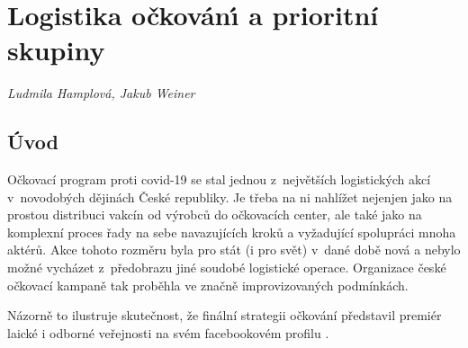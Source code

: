 
\chapter{Logistika o\v{c}kov\'{a}n\'{\i} a prioritní skupiny} \label{Logistika_ockovani}

\textit{Ludmila Hamplová, Jakub Weiner}
\vspace{15mm}


\section*{Úvod} %
Očkovací program proti covid-19 se stal jednou z~největších logistických akcí v~novodobých dějinách České republiky. Je třeba na ni nahlížet nejenjen jako na prostou distribuci vakcín od výrobců do očkovacích center, ale také jako na komplexní proces řady na sebe navazujících kroků a vyžadující spolupráci mnoha aktérů. Akce tohoto rozměru byla pro stát (i pro svět) v~dané době nová a nebylo možné vycházet z~předobrazu jiné soudobé logistické operace. Organizace české očkovací kampaně tak proběhla ve značně improvizovaných podmínkách. %


    
Názorně to ilustruje skutečnost, že finální strategii očkování představil premiér laické i odborné veřejnosti na svém facebookovém profilu \cite{logoc_caulidi}. 


